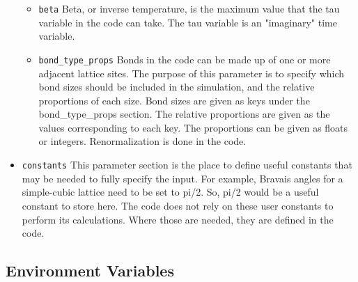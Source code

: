 \begin{itemize}
\begin{itemize}
      \item \texttt{beta}
        Beta, or inverse temperature, is the maximum value that the tau 
        variable in the code can take.
        The tau variable is an "imaginary" time variable.
      \item \texttt{bond\_type\_props}
        Bonds in the code can be made up of one or more adjacent lattice sites.
        The purpose of this parameter is to specify which bond sizes should be
        included in the simulation, and the relative proportions of each size.
        Bond sizes are given as keys under the bond\_type\_props section.
        The relative proportions are given as the values corresponding to each 
        key.
        The proportions can be given as floats or integers. 
        Renormalization is done in the code.
    \end{itemize}
  \item \texttt{constants}
    This parameter section is the place to define useful constants that may be
    needed to fully specify the input. 
    For example, Bravais angles for a simple-cubic lattice need to be set to 
    pi/2.
    So, pi/2 would be a useful constant to store here.
    The code does not rely on these user constants to perform its calculations.
    Where those are needed, they are defined in the code. 
\end{itemize}


\subsection{Environment Variables}